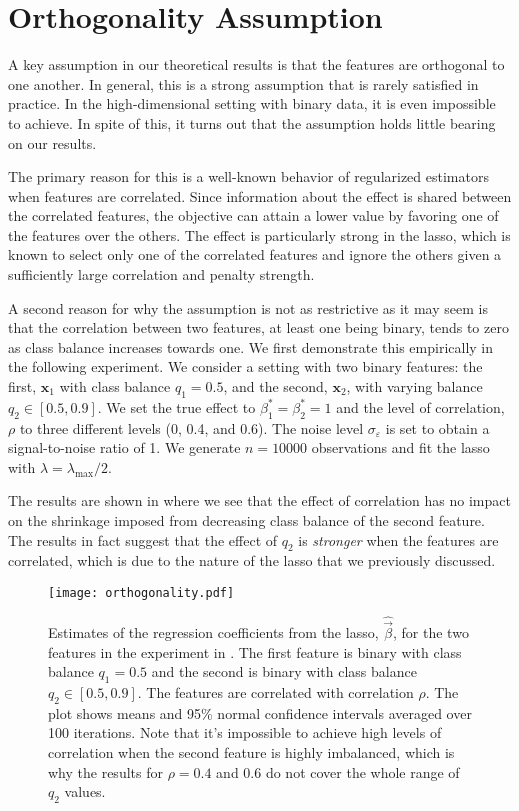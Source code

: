 
\section{Orthogonality Assumption}
\label{sec:orthogonality-assumption}

A key assumption in our theoretical results is that the features are orthogonal to one
another. In general, this is a strong assumption that is rarely satisfied in practice. In
the high-dimensional setting with binary data, it is even impossible to achieve. In spite
of this, it turns out that the assumption holds little bearing on our results.

The primary reason for this is a well-known behavior of regularized estimators when
features are correlated. Since information about the effect is shared between the
correlated features, the objective can attain a lower value by favoring one of the features
over the others. The effect is particularly strong in the lasso, which is known to select
only one of the correlated features and ignore the others given a sufficiently large
correlation and penalty strength.

A second reason for why the assumption is not as restrictive as it may seem is that the
correlation between two features, at least one being binary, tends to zero as class balance
increases towards one. We first demonstrate this empirically in the following experiment.
We consider a setting with two binary features: the first, \(\bm{x}_1\) with class balance
\(q_1 = 0.5\), and the second, \(\bm{x}_2\), with varying balance \(q_2 \in [0.5, 0.9]\).
We set the true effect to \(\beta_1^* = \beta_2^* = 1\) and the level of correlation,
\(\rho\) to three different levels (0, 0.4, and 0.6). The noise level
\(\sigma_\varepsilon\) is set to obtain a signal-to-noise ratio of 1. We generate
\(n=\num{10000}\) observations and fit the lasso with \(\lambda = \lambda_\text{max}/2\).

The results are shown in  where we see that the effect of
correlation has no impact on the shrinkage imposed from decreasing class balance of the
second feature. The results in fact suggest that the effect of \(q_2\) is \emph{stronger}
when the features are correlated, which is due to the nature of the lasso that we
previously discussed.

\begin{figure}[htpb]
  \centering
  \texttt{[image: orthogonality.pdf]}
  \caption{%
    Estimates of the regression coefficients from the lasso,
    \(\hat{\vec{\beta}}\), for the two features in the experiment in
    . The first feature is binary with class
    balance \(q_1 = 0.5\) and the second is binary with class balance \(q_2 \in [0.5, 0.9]\).
    The features are correlated with correlation \(\rho\). The plot shows means and
    95\% normal confidence intervals averaged over 100 iterations. Note
    that it's impossible to achieve high levels of correlation when the second
    feature is highly imbalanced, which is why the results for \(\rho = 0.4\) and \(0.6\)
    do not cover the whole range of \(q_2\) values.
  }
  \label{fig:orthogonality}
\end{figure}

